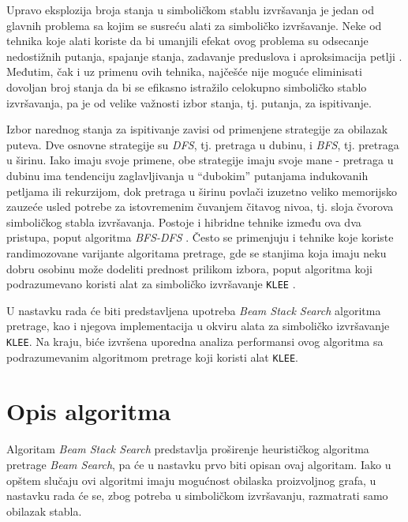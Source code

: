 \documentclass[a4paper]{article}
\begin{document}
Upravo eksplozija broja stanja u simboličkom stablu izvršavanja je jedan od glavnih problema sa kojim se susreću alati za simboličko izvršavanje. Neke od tehnika koje alati koriste da bi umanjili efekat ovog problema su odsecanje nedostižnih putanja, spajanje stanja, zadavanje preduslova i aproksimacija petlji \cite{SurveySymExec-CSUR18}. Međutim, čak i uz primenu ovih tehnika, najčešće nije moguće eliminisati dovoljan broj stanja da bi se efikasno istražilo celokupno simboličko stablo izvršavanja, pa je od velike važnosti izbor stanja, tj. putanja, za ispitivanje.

Izbor narednog stanja za ispitivanje zavisi od primenjene strategije za obilazak puteva. Dve osnovne strategije su \textit{DFS}, tj. pretraga u dubinu, i \textit{BFS}, tj. pretraga u širinu. Iako imaju svoje primene, obe strategije imaju svoje mane - pretraga u dubinu ima tendenciju zaglavljivanja u \enquote{dubokim} putanjama indukovanih petljama ili rekurzijom, dok pretraga u širinu povlači izuzetno veliko memorijsko zauzeće usled potrebe za istovremenim čuvanjem čitavog nivoa, tj. sloja čvorova simboličkog stabla izvršavanja. Postoje i hibridne tehnike između ova dva pristupa, poput algoritma \textit{BFS-DFS} \cite{BFS/DFS-StrahinjaStanojevic}. Često se primenjuju i tehnike koje koriste randimozovane varijante algoritama pretrage, gde se stanjima koja imaju neku dobru osobinu može dodeliti prednost prilikom izbora, poput algoritma koji podrazumevano koristi alat za simboličko izvršavanje \verb|KLEE| \cite{KLEE-paper-10.5555/1855741.1855756}.

U nastavku rada će biti predstavljena upotreba \textit{Beam Stack Search} algoritma pretrage, kao i njegova implementacija u okviru alata za simboličko izvršavanje \verb|KLEE|. Na kraju, biće izvršena uporedna analiza performansi ovog algoritma sa podrazumevanim algoritmom pretrage koji koristi alat \verb|KLEE|.

\section{Opis algoritma}

Algoritam \textit{Beam Stack Search} \cite{BeamStackSearch-10.5555/3037062.3037074} predstavlja proširenje heurističkog algoritma pretrage \textit{Beam Search}, pa će u nastavku prvo biti opisan ovaj algoritam. Iako u opštem slučaju ovi algoritmi imaju mogućnost obilaska proizvoljnog grafa, u nastavku rada će se, zbog potreba u simboličkom izvršavanju, razmatrati samo obilazak stabla.
\end{document}
